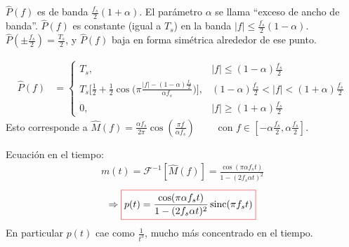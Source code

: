 \begin{remarkSN} $\hat{P}(f)$ es de banda $\frac{f_s}{2}(1+\alpha)$. El parámetro $\alpha$ se llama ``exceso de ancho de banda''.
    $\hat{P}(f)$ es constante (igual a $T_s$) en la banda $|f|\leq \frac{f_s}{2}(1-\alpha)$.  $\hat{P}(\pm \frac{f_s}{2}) = \frac{T_s}{2}$, y $\hat{P}(f)$ baja en forma simétrica alrededor de ese punto.
%
\end{remarkSN}


\begin{ejemplo}
\begin{align*}
\hat{P}(f) & =
\begin{cases}
 T_s, & |f| \leq (1-\alpha) \frac{f_s}{2}  \\
 T_s \Big[\frac{1}{2} + \frac{1}{2} \cos\Big(\pi
\frac{|f|-(1-\alpha) \frac{f_s}{2} } {\alpha f_s} \Big)\Big], &
(1-\alpha) \frac{f_s}{2}  < |f| <
(1+\alpha) \frac{f_s}{2}  \\
0,&  |f| \geq (1+\alpha) \frac{ f_s}{2}
\end{cases}%
\end{align*}
    Esto corresponde a $\hat{M}(f)=\frac{\alpha f_s}{2 \pi}\cos\left(\frac{\pi f}{\alpha
f_s}\right)\qquad \text{ con }f \in
\left[-\alpha\frac{f_s}{2},\alpha\frac{f_s}{2}\right]$.

    Ecuación en el tiempo:
    \begin{align*}
        m(t)    = \mathcal{F}^{-1}\left[\hat{M}(f)\right] = \frac{\cos(\pi \alpha f_s t)}{1-(2 f_s \alpha t)^2}
    \end{align*}
\[ \Rightarrow \col{p(t) = \frac{\cos(\pi \alpha f_s t)}{1-(2 f_s \alpha t)^2} \sinc (\pi f_s
t)}\] En particular $p(t)$ cae como $\frac{1}{t^3}$, mucho más
concentrado en el tiempo.
    \FloatBarrier
    \begin{figure}[htb]
        \centering\begin{minipage}{\textwidth}
        \endpgfgraphicnamed\end{minipage}
    \end{figure}


\end{ejemplo}
